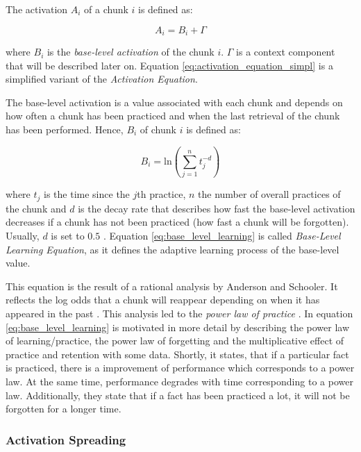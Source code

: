 The activation $A_i$ of a chunk $i$ is defined as:

\begin{equation}
 \label{eq:activation_equation_simpl}
 A_i = B_i + \Gamma
\end{equation}

where $B_i$ is the \emph{base-level activation} of the chunk $i$. $\Gamma$ is a context component that will be described later on. Equation \eqref{eq:activation_equation_simpl} is a simplified variant of the \emph{Activation Equation}.

The base-level activation is a value associated with each chunk and depends on how often a chunk has been practiced and when the last retrieval of the chunk has been performed. Hence, $B_i$ of chunk $i$ is defined as:

\begin{equation}
\label{eq:base_level_learning}
B_i = \mathrm{ln}\left(\sum_{j=1}^n{t_j^{-d}}\right)
\end{equation}

where $t_j$ is the time since the $j$th practice, $n$ the number of overall practices of the chunk and $d$ is the decay rate that describes how fast the base-level activation decreases if a chunk has not been practiced (how fast a chunk will be forgotten). Usually, $d$ is set to $0.5$ \cite[p. 1042]{anderson_integrated_2004}. Equation \eqref{eq:base_level_learning} is called \emph{Base-Level Learning Equation}, as it defines the adaptive learning process of the base-level value.

This equation is the result of a rational analysis by Anderson and Schooler. It reflects the log odds that a chunk will reappear depending on when it has appeared in the past \cite[33]{taatgen_modeling_2006}. This analysis led to the \emph{power law of practice} \cite[1042]{anderson_integrated_2004}. In \cite[8--11]{anderson_implications_2000} equation \eqref{eq:base_level_learning} is motivated in more detail by describing the power law of learning/practice, the power law of forgetting and the multiplicative effect of practice and retention with some data. Shortly, it states, that if a particular fact is practiced, there is a improvement of performance which corresponds to a power law. At the same time, performance degrades with time corresponding to a power law. Additionally, they state that if a fact has been practiced a lot, it will not be forgotten for a longer time.

\subsubsection{Activation Spreading}

